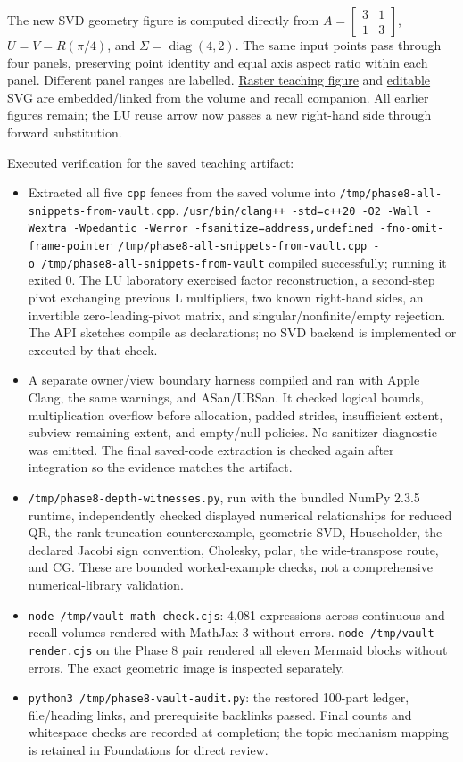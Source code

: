 The new SVD geometry figure is computed directly from \(A=\begin{bmatrix}3&1\\1&3\end{bmatrix}\), \(U=V=R(\pi/4)\), and \(\Sigma=\operatorname{diag}(4,2)\). The same input points pass through four panels, preserving point identity and equal axis aspect ratio within each panel. Different panel ranges are labelled. \href{Visual\%20Recall/phase8_svd_geometry.png}{Raster teaching figure} and \href{Visual\%20Recall/phase8_svd_geometry.svg}{editable SVG} are embedded/linked from the volume and recall companion. All earlier figures remain; the LU reuse arrow now passes a new right-hand side through forward substitution.

Executed verification for the saved teaching artifact:

\begin{itemize}
\tightlist
\item
  Extracted all five \texttt{cpp} fences from the saved volume into \texttt{/tmp/phase8-all-snippets-from-vault.cpp}. \texttt{/usr/bin/clang++\ -std=c++20\ -O2\ -Wall\ -Wextra\ -Wpedantic\ -Werror\ -fsanitize=address,undefined\ -fno-omit-frame-pointer\ /tmp/phase8-all-snippets-from-vault.cpp\ -o\ /tmp/phase8-all-snippets-from-vault} compiled successfully; running it exited 0. The LU laboratory exercised factor reconstruction, a second-step pivot exchanging previous L multipliers, two known right-hand sides, an invertible zero-leading-pivot matrix, and singular/nonfinite/empty rejection. The API sketches compile as declarations; no SVD backend is implemented or executed by that check.
\item
  A separate owner/view boundary harness compiled and ran with Apple Clang, the same warnings, and ASan/UBSan. It checked logical bounds, multiplication overflow before allocation, padded strides, insufficient extent, subview remaining extent, and empty/null policies. No sanitizer diagnostic was emitted. The final saved-code extraction is checked again after integration so the evidence matches the artifact.
\item
  \texttt{/tmp/phase8-depth-witnesses.py}, run with the bundled NumPy 2.3.5 runtime, independently checked displayed numerical relationships for reduced QR, the rank-truncation counterexample, geometric SVD, Householder, the declared Jacobi sign convention, Cholesky, polar, the wide-transpose route, and CG. These are bounded worked-example checks, not a comprehensive numerical-library validation.
\item
  \texttt{node\ /tmp/vault-math-check.cjs}: 4,081 expressions across continuous and recall volumes rendered with MathJax 3 without errors. \texttt{node\ /tmp/vault-render.cjs} on the Phase 8 pair rendered all eleven Mermaid blocks without errors. The exact geometric image is inspected separately.
\item
  \texttt{python3\ /tmp/phase8-vault-audit.py}: the restored 100-part ledger, file/heading links, and prerequisite backlinks passed. Final counts and whitespace checks are recorded at completion; the topic mechanism mapping is retained in Foundations for direct review.
\end{itemize}

